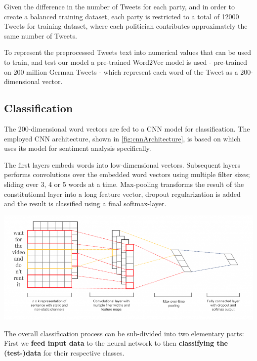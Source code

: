 \documentclass[10pt, oneside]{article}
\newenvironment{Figure}
	{\par\medskip\noindent\minipage{\linewidth}}
	{\endminipage\par\medskip}
\begin{document}
\begin{multicols}{2}
Given the difference in the number of Tweets for each party, and in order to create a balanced training dataset, each party is restricted to a total of 12000 Tweets for training dataset, where each politician contributes approximately the same number of Tweets.

To represent the preprocessed Tweets text into numerical values that can be used to train, and test our model a pre-trained Word2Vec model is used \cite{DBLP:journals/corr/abs-1301-3781} - pre-trained on 200 million German Tweets \cite{cieliebak2017twitter} - which represent each word of the Tweet as a 200-dimensional vector.

\subsection{Classification}

The 200-dimensional word vectors are fed to a CNN model for classification.
The employed CNN architecture, shown in \autoref{fig:cnnArchitecture},  is based on \cite{Kim2014} which uses its model for sentiment analysis specifically.

The first layers embeds words into low-dimensional vectors. Subsequent layers performs convolutions over the embedded word vectors using multiple filter sizes; sliding over 3, 4 or 5 words at a time. Max-pooling transforms the result of the constitutional layer into a long feature vector, dropout regularization is added and the result is classified using a final softmax-layer.

\begin{Figure}
	\centering
	\includegraphics[width=\linewidth]{images/cnn_architecture1.png}
	\label{fig:cnnArchitecture}
\end{Figure}

The overall classification process can be sub-divided into two elementary parts: First we \textbf{feed input data} to the neural network to then \textbf{classifying the (test-)data} for their respective classes.


\end{multicols}
\end{document}
